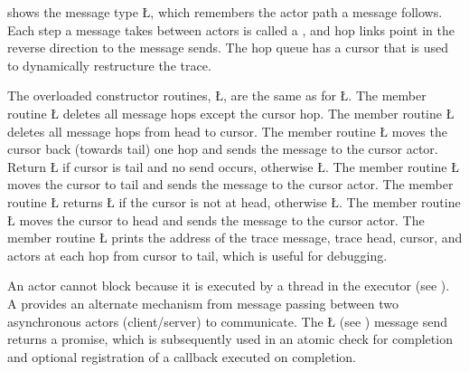 \documentclass[openright,twoside]{report}
\begin{document}
 shows the message type \LGinlinetrue\LGbegin\lgrinde\L{}\endlgrinde\LGend{}, which remembers the actor path a message follows.
Each step a message takes between actors is called a , and hop links point in the reverse direction to the message sends.
The hop queue has a cursor that is used to dynamically restructure the trace.
\begin{center}

\end{center}
The overloaded constructor routines, \LGinlinetrue\LGbegin\lgrinde\L{}\endlgrinde\LGend{}, are the same as for \LGinlinetrue\LGbegin\lgrinde\L{}\endlgrinde\LGend{}.
The member routine \LGinlinetrue\LGbegin\lgrinde\L{}\endlgrinde\LGend{} deletes all message hops except the cursor hop.
The member routine \LGinlinetrue\LGbegin\lgrinde\L{}\endlgrinde\LGend{} deletes all message hops from head to cursor.
The member routine \LGinlinetrue\LGbegin\lgrinde\L{}\endlgrinde\LGend{} moves the cursor back (towards tail) one hop and sends the message to the cursor actor.
Return \LGinlinetrue\LGbegin\lgrinde\L{}\endlgrinde\LGend{} if cursor is tail and no send occurs, otherwise \LGinlinetrue\LGbegin\lgrinde\L{}\endlgrinde\LGend{}.
The member routine \LGinlinetrue\LGbegin\lgrinde\L{}\endlgrinde\LGend{} moves the cursor to tail and sends the message to the cursor actor.
The member routine \LGinlinetrue\LGbegin\lgrinde\L{}\endlgrinde\LGend{} returns \LGinlinetrue\LGbegin\lgrinde\L{}\endlgrinde\LGend{} if the cursor is not at head, otherwise \LGinlinetrue\LGbegin\lgrinde\L{}\endlgrinde\LGend{}.
The member routine \LGinlinetrue\LGbegin\lgrinde\L{}\endlgrinde\LGend{} moves the cursor to head and sends the message to the cursor actor.
The member routine \LGinlinetrue\LGbegin\lgrinde\L{}\endlgrinde\LGend{} prints the address of the trace message, trace head, cursor, and actors at each hop from cursor to tail, which is useful for debugging.

An actor cannot block because it is executed by a thread in the executor (see ).
A  provides an alternate mechanism from message passing between two asynchronous actors (client/server) to communicate.
The \LGinlinetrue\LGbegin\lgrinde\L{}\endlgrinde\LGend{} (see ) message send returns a promise, which is subsequently used in an atomic check for completion and optional registration of a callback executed on completion.
\end{document}
